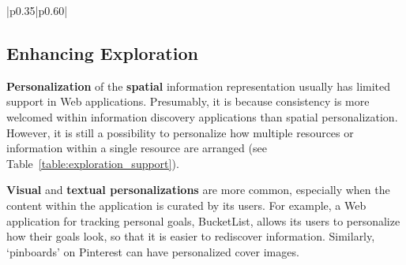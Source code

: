 {{\begin{table}[ht!]
\begin{tabular}{{|p{0.35\linewidth}|p{0.60\linewidth}|}}
\end{tabular}
\end{table}


} %
{\subsection{Enhancing Exploration}
\textbf{Personalization} of the \textbf{spatial} information representation usually has limited support in Web applications. Presumably, it is because consistency is more welcomed within information discovery applications than spatial personalization. However, it is still a possibility to personalize how multiple resources or information within a single resource are arranged (see Table~\ref{table:exploration_support}). 

\textbf{Visual} and \textbf{textual personalizations} are more common, especially when the content within the application is curated by its users.  For example, a Web application for tracking personal goals, BucketList, allows its users to personalize how their goals look, so that it is easier to rediscover information. Similarly, `pinboards' on Pinterest can have personalized cover images.

}}
